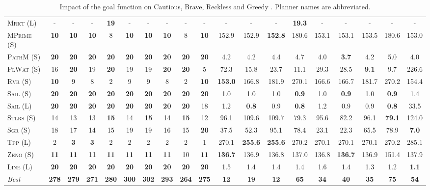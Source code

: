\documentclass[11pt,landscape]{article}
\begin{document}
\begin{table}[tb]
{\begin{tabular}{|l||ccccccccc||ccccccccc||}
\textsc{Mrkt} (L)&-&-&-&\textbf{19}&-&-&-&-&-&-&-&-&\textbf{19.3}&-&-&-&-&-\\
\textsc{MPrime} (S)&\textbf{10}&\textbf{10}&\textbf{10}&8&\textbf{10}&\textbf{10}&\textbf{10}&8&\textbf{10}&152.9&152.9&\textbf{152.8}&180.6&153.1&153.1&153.5&180.6&153.0\\
\textsc{PathM} (S)&\textbf{20}&\textbf{20}&\textbf{20}&\textbf{20}&\textbf{20}&\textbf{20}&\textbf{20}&\textbf{20}&\textbf{20}&4.2&4.2&4.4&4.7&4.0&\textbf{3.7}&4.2&5.0&4.0\\
\textsc{PlWat} (S)&16&\textbf{20}&19&\textbf{20}&19&19&\textbf{20}&\textbf{20}&5&72.3&15.8&23.7&11.1&29.3&28.5&\textbf{9.1}&9.7&226.6\\
\textsc{Rvr} (S)&\textbf{10}&9&8&2&9&9&8&2&\textbf{10}&\textbf{153.0}&166.8&181.9&270.1&166.6&166.7&181.7&270.2&154.4\\
\textsc{Sail} (S)&\textbf{20}&\textbf{20}&\textbf{20}&\textbf{20}&\textbf{20}&\textbf{20}&\textbf{20}&\textbf{20}&\textbf{20}&1.0&1.0&1.0&\textbf{0.9}&1.0&\textbf{0.9}&1.0&\textbf{0.9}&1.4\\
\textsc{Sail} (L)&\textbf{20}&\textbf{20}&\textbf{20}&\textbf{20}&\textbf{20}&\textbf{20}&\textbf{20}&\textbf{20}&18&1.2&\textbf{0.8}&0.9&\textbf{0.8}&1.2&0.9&0.9&\textbf{0.8}&33.5\\
\textsc{Stlrs} (S)&14&13&13&\textbf{15}&14&\textbf{15}&14&\textbf{15}&12&96.1&109.6&109.7&79.3&95.6&82.2&96.1&\textbf{79.1}&124.0\\
\textsc{Sgr} (S)&18&17&14&15&19&19&16&15&\textbf{20}&37.5&52.3&95.1&78.4&23.1&22.3&65.5&78.9&\textbf{7.0}\\
\textsc{Tpp} (L)&2&\textbf{3}&\textbf{3}&2&2&2&2&2&1&270.1&\textbf{255.6}&\textbf{255.6}&270.2&270.1&270.1&270.1&270.2&285.1\\
\textsc{Zeno} (S)&\textbf{11}&\textbf{11}&\textbf{11}&\textbf{11}&\textbf{11}&\textbf{11}&\textbf{11}&10&\textbf{11}&\textbf{136.7}&136.9&136.8&137.0&136.8&\textbf{136.7}&136.9&151.4&137.9\\
\textsc{Line} (L)&\textbf{20}&\textbf{20}&\textbf{20}&\textbf{20}&\textbf{20}&\textbf{20}&\textbf{20}&\textbf{20}&\textbf{20}&1.5&1.4&1.4&1.4&1.6&1.4&1.3&1.2&\textbf{1.1}
\\\hline
\textit{Best}&\textbf{278}&\textbf{279}&\textbf{271}&\textbf{280}&\textbf{300}&\textbf{302}&\textbf{293}&\textbf{264}&\textbf{275}&\textbf{12}&\textbf{19}&\textbf{12}&\textbf{65}&\textbf{34}&\textbf{40}&\textbf{35}&\textbf{75}&\textbf{54}\\\hline

        \end{tabular}}
        \caption{Impact of the goal function on Cautious, Brave, Reckless and Greedy \pattyd. Planner names are abbreviated.}
        \label{tab:abl-gf}
        \end{table}
        
\end{document}
